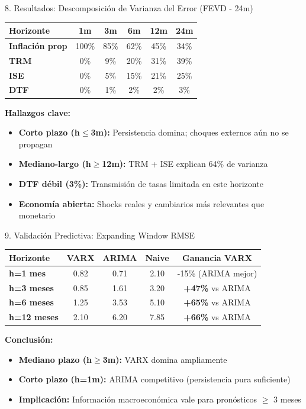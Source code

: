 \documentclass[spanish, 11pt]{beamer}
\begin{document}
\begin{frame}{8. Resultados: Descomposición de Varianza del Error (FEVD - 24m)}
\normalsize
\vspace{0.2cm}
\centering
\small
\begin{tabular}{lccccc}
\toprule
\textbf{Horizonte} & \textbf{1m} & \textbf{3m} & \textbf{6m} & \textbf{12m} & \textbf{24m} \\
\midrule
\textbf{Inflación prop} & 100\% & 85\% & 62\% & 45\% & 34\% \\
\textbf{TRM} & 0\% & 9\% & 20\% & 31\% & 39\% \\
\textbf{ISE} & 0\% & 5\% & 15\% & 21\% & 25\% \\
\textbf{DTF} & 0\% & 1\% & 2\% & 2\% & 3\% \\
\bottomrule
\end{tabular}

\vspace{0.3cm}
\normalsize
\textbf{Hallazgos clave:}
\begin{itemize}
  \item \textbf{Corto plazo (h$\leq$3m):} Persistencia domina; choques externos aún no se propagan
  \item \textbf{Mediano-largo (h$\geq$12m):} TRM + ISE explican 64\% de varianza
  \item \textbf{DTF débil (3\%):} Transmisión de tasas limitada en este horizonte
  \item \textbf{Economía abierta:} Shocks reales y cambiarios más relevantes que monetario
\end{itemize}
\end{frame}

\begin{frame}{9. Validación Predictiva: Expanding Window RMSE}
\normalsize
\centering
\small
\begin{tabular}{lcccc}
\toprule
\textbf{Horizonte} & \textbf{VARX} & \textbf{ARIMA} & \textbf{Naive} & \textbf{Ganancia VARX} \\
\midrule
\textbf{h=1 mes} & 0.82 & 0.71 & 2.10 & -15\% (ARIMA mejor) \\
\textbf{h=3 meses} & 0.85 & 1.61 & 3.20 & \textbf{+47\%} vs ARIMA \\
\textbf{h=6 meses} & 1.25 & 3.53 & 5.10 & \textbf{+65\%} vs ARIMA \\
\textbf{h=12 meses} & 2.10 & 6.20 & 7.85 & \textbf{+66\%} vs ARIMA \\
\bottomrule
\end{tabular}

\vspace{0.3cm}
\normalsize
\textbf{Conclusión:}
\begin{itemize}
  \item \textbf{Mediano plazo (h$\geq$3m):} VARX domina ampliamente
  \item \textbf{Corto plazo (h=1m):} ARIMA competitivo (persistencia pura suficiente)
  \item \textbf{Implicación:} Información macroeconómica vale para pronósticos $\geq$ 3 meses
\end{itemize}
\end{frame}
\end{document}
